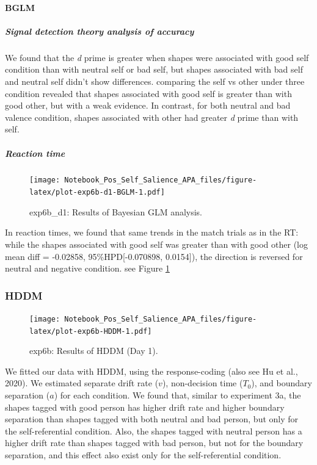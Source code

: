 \documentclass[
  english,
  man]{apa6}
\let\oldparagraph\paragraph
\renewcommand{\paragraph}[1]{\oldparagraph{#1}\mbox{}}
\let\oldsubparagraph\subparagraph
\renewcommand{\subparagraph}[1]{\oldsubparagraph{#1}\mbox{}}
\begin{document}
\hypertarget{bglm-4}{%
\paragraph{BGLM}\label{bglm-4}}

\hypertarget{signal-detection-theory-analysis-of-accuracy-6}{%
\subparagraph{Signal detection theory analysis of accuracy}\label{signal-detection-theory-analysis-of-accuracy-6}}

We found that the \emph{d} prime is greater when shapes were associated with good self condition than with neutral self or bad self, but shapes associated with bad self and neutral self didn't show differences. comparing the self vs other under three condition revealed that shapes associated with good self is greater than with good other, but with a weak evidence. In contrast, for both neutral and bad valence condition, shapes associated with other had greater \emph{d} prime than with self.

\hypertarget{reaction-time-9}{%
\subparagraph{Reaction time}\label{reaction-time-9}}

\begin{figure}
\centering
\texttt{[image: Notebook\_Pos\_Self\_Salience\_APA\_files/figure-latex/plot-exp6b-d1-BGLM-1.pdf]}
\caption{\label{fig:plot-exp6b-d1-BGLM}exp6b\_d1: Results of Bayesian GLM analysis.}
\end{figure}

In reaction times, we found that same trends in the match trials as in the RT: while the shapes associated with good self was greater than with good other (log mean diff = -0.02858, 95\%HPD{[}-0.070898, 0.0154{]}), the direction is reversed for neutral and negative condition. see Figure \ref{fig:plot-exp6b-d1-BGLM}

\hypertarget{hddm-7}{%
\subsubsection{HDDM}\label{hddm-7}}

\begin{figure}
\centering
\texttt{[image: Notebook\_Pos\_Self\_Salience\_APA\_files/figure-latex/plot-exp6b-HDDM-1.pdf]}
\caption{\label{fig:plot-exp6b-HDDM}exp6b: Results of HDDM (Day 1).}
\end{figure}

We fitted our data with HDDM, using the response-coding (also see Hu et al., 2020). We estimated separate drift rate (\(v\)), non-decision time (\(T_{0}\)), and boundary separation (\(a\)) for each condition. We found that, similar to experiment 3a, the shapes tagged with good person has higher drift rate and higher boundary separation than shapes tagged with both neutral and bad person, but only for the self-referential condition. Also, the shapes tagged with neutral person has a higher drift rate than shapes tagged with bad person, but not for the boundary separation, and this effect also exist only for the self-referential condition.
\end{document}
